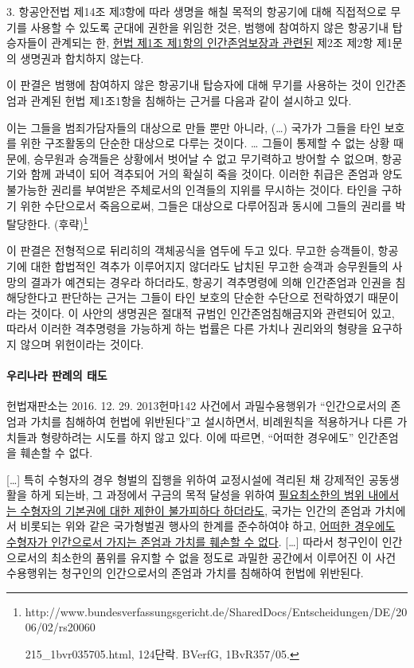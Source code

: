 3. 항공안전법 제14조 제3항에 따라 생명을 해칠 목적의 항공기에 대해 직접적으로 무기를 사용할 수 있도록 군대에 권한을 위임한 것은, 범행에 참여하지 않은 항공기내 탑승자들이 관계되는 한, \ul{헌법 제1조 제1항의 인간존엄보장과 관련된} 제2조 제2항 제1문의 생명권과 합치하지 않는다.

이 판결은 범행에 참여하지 않은 항공기내 탑승자에 대해 무기를 사용하는 것이 인간존엄과 관계된 헌법 제1조1항을 침해하는 근거를 다음과 같이 설시하고 있다.

이는 그들을 범죄가담자들의 대상으로 만들 뿐만 아니라, (\ldots) 국가가 그들을 타인 보호를 위한 구조활동의 단순한 대상으로 다루는 것이다. \ldots{} 그들이 통제할 수 없는 상황 때문에, 승무원과 승객들은 상황에서 벗어날 수 없고 무기력하고 방어할 수 없으며, 항공기와 함께 과녁이 되어 격추되어 거의 확실히 죽을 것이다. 이러한 취급은 존엄과 양도불가능한 권리를 부여받은 주체로서의 인격들의 지위를 무시하는 것이다. 타인을 구하기 위한 수단으로서 죽음으로써, 그들은 대상으로 다루어짐과 동시에 그들의 권리를 박탈당한다. (후략)\footnote{http://www.bundesverfassungsgericht.de/SharedDocs/Entscheidungen/DE/2006/02/rs20060

  215\_1bvr035705.html, 124단락. BVerfG, 1BvR357/05.}

이 판결은 전형적으로 뒤리히의 객체공식을 염두에 두고 있다. 무고한 승객들이, 항공기에 대한 합법적인 격추가 이루어지지 않더라도 납치된 무고한 승객과 승무원들의 사망의 결과가 예견되는 경우라 하더라도, 항공기 격추명령에 의해 인간존엄과 인권을 침해당한다고 판단하는 근거는 그들이 타인 보호의 단순한 수단으로 전락하였기 때문이라는 것이다. 이 사안의 생명권은 절대적 규범인 인간존엄침해금지와 관련되어 있고, 따라서 이러한 격추명령을 가능하게 하는 법률은 다른 가치나 권리와의 형량을 요구하지 않으며 위헌이라는 것이다.

\paragraph{우리나라 판례의 태도}

헌법재판소는 2016. 12. 29. 2013헌마142 사건에서 과밀수용행위가 ``인간으로서의 존엄과 가치를 침해하여 헌법에 위반된다''고 설시하면서, 비례원칙을 적용하거나 다른 가치들과 형량하려는 시도를 하지 않고 있다. 이에 따르면, ``어떠한 경우에도'' 인간존엄을 훼손할 수 없다.

{[}\ldots{]} 특히 수형자의 경우 형벌의 집행을 위하여 교정시설에 격리된 채 강제적인 공동생활을 하게 되는바, 그 과정에서 구금의 목적 달성을 위하여 \ul{필요최소한의 범위 내에서는 수형자의 기본권에 대한 제한이 불가피하다 하더라도}, 국가는 인간의 존엄과 가치에서 비롯되는 위와 같은 국가형벌권 행사의 한계를 준수하여야 하고, \ul{어떠한 경우에도 수형자가 인간으로서 가지는 존엄과 가치를 훼손할 수 없다}. {[}\ldots{]} 따라서 청구인이 인간으로서의 최소한의 품위를 유지할 수 없을 정도로 과밀한 공간에서 이루어진 이 사건 수용행위는 청구인의 인간으로서의 존엄과 가치를 침해하여 헌법에 위반된다.

